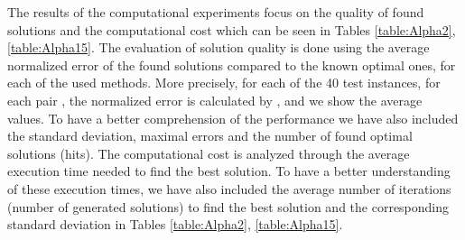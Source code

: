 The results of the computational experiments focus on the quality of found solutions and the computational cost which can be seen in Tables \ref{table:Alpha2}, \ref{table:Alpha15}. The evaluation of solution quality is done using the  average normalized error of the found solutions compared to the known optimal ones, for each of the used methods. More precisely, for each of the 40 test instances, for each pair ,  the normalized error is calculated by , and we show the average values.  To have a better comprehension of the performance we have also included the standard deviation, maximal errors and the number of found optimal solutions (hits).  The computational cost is analyzed through  the average execution time  needed to find the best solution. To have a better understanding of these execution times,  we have also included the average number of iterations (number of generated solutions) to find the best solution and the corresponding standard deviation in Tables \ref{table:Alpha2}, \ref{table:Alpha15}.


